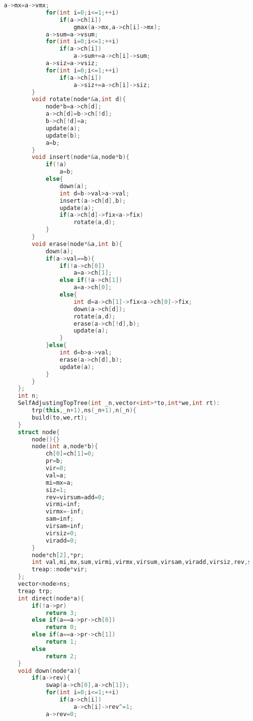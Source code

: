 \documentclass{book}
\begin{document}
\begin{lstlisting}[language=C++,title={Dynamic Tree (Self-Adjusting Top Tree).hpp (12629 bytes, 443 lines)}]
            a->mx=a->vmx;
            for(int i=0;i<=1;++i)
                if(a->ch[i])
                    gmax(a->mx,a->ch[i]->mx);
            a->sum=a->vsum;
            for(int i=0;i<=1;++i)
                if(a->ch[i])
                    a->sum+=a->ch[i]->sum;
            a->siz=a->vsiz;
            for(int i=0;i<=1;++i)
                if(a->ch[i])
                    a->siz+=a->ch[i]->siz;
        }
        void rotate(node*&a,int d){
            node*b=a->ch[d];
            a->ch[d]=b->ch[!d];
            b->ch[!d]=a;
            update(a);
            update(b);
            a=b;
        }
        void insert(node*&a,node*b){
            if(!a)
                a=b;
            else{
                down(a);
                int d=b->val>a->val;
                insert(a->ch[d],b);
                update(a);
                if(a->ch[d]->fix<a->fix)
                    rotate(a,d);
            }
        }
        void erase(node*&a,int b){
            down(a);
            if(a->val==b){
                if(!a->ch[0])
                    a=a->ch[1];
                else if(!a->ch[1])
                    a=a->ch[0];
                else{
                    int d=a->ch[1]->fix<a->ch[0]->fix;
                    down(a->ch[d]);
                    rotate(a,d);
                    erase(a->ch[!d],b);
                    update(a);
                }
            }else{
                int d=b>a->val;
                erase(a->ch[d],b);
                update(a);
            }
        }
    };
    int n;
    SelfAdjustingTopTree(int _n,vector<int>*to,int*we,int rt):
        trp(this,_n+1),ns(_n+1),n(_n){
        build(to,we,rt);
    }
    struct node{
        node(){}
        node(int a,node*b){
            ch[0]=ch[1]=0;
            pr=b;
            vir=0;
            val=a;
            mi=mx=a;
            siz=1;
            rev=virsum=add=0;
            virmi=inf;
            virmx=-inf;
            sam=inf;
            virsam=inf;
            virsiz=0;
            viradd=0;
        }
        node*ch[2],*pr;
        int val,mi,mx,sum,virmi,virmx,virsum,virsam,viradd,virsiz,rev,sam,siz,add;
        treap::node*vir;
    };
    vector<node>ns;
    treap trp;
    int direct(node*a){
        if(!a->pr)
            return 3;
        else if(a==a->pr->ch[0])
            return 0;
        else if(a==a->pr->ch[1])
            return 1;
        else
            return 2;
    }
    void down(node*a){
        if(a->rev){
            swap(a->ch[0],a->ch[1]);
            for(int i=0;i<=1;++i)
                if(a->ch[i])
                    a->ch[i]->rev^=1;
            a->rev=0;

\end{lstlisting}
\end{document}
